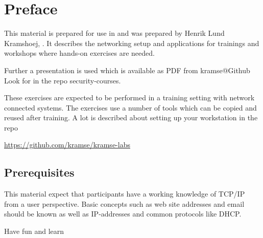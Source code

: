 \documentclass[a4paper,11pt,notitlepage]{report}
\begin{document}
\rm
{}

\newcommand{\emne}[1]{hacker workshop}
\newcommand{\kursus}[1]{ethical hacker workshop}
\newcommand{\kursusnavn}[1]{ethical hacker workshop\\ exercises}




\setcounter{tocdepth}{0}

\normal

{\color{titlecolor}\tableofcontents}

\normal
\pagestyle{fancyplain}
\chapter*{\color{titlecolor}Preface}

This material is prepared for use in \emph{\kursus} and was prepared by
Henrik Lund Kramshoej,  .
It describes the networking setup and
applications for trainings and workshops where hands-on exercises are needed.

\vskip 1cm
Further a presentation is used which is available as PDF from kramse@Github\\
Look for \jobname in the repo security-courses.

These exercises are expected to be performed in a training setting with network connected systems. The exercises use a number of tools which can be copied and reused after training. A lot is described about setting up your workstation in the repo

\url{https://github.com/kramse/kramse-labs}



\section*{\color{titlecolor}Prerequisites}

This material expect that participants have a working knowledge of
TCP/IP from a user perspective. Basic concepts such as web site addresses and email should be known as well as IP-addresses and common protocols like DHCP.

\vskip 1cm
Have fun and learn
\eject

\rhead{\fancyplain{}{\bf \chaptername\ \thechapter}}
\end{document}
